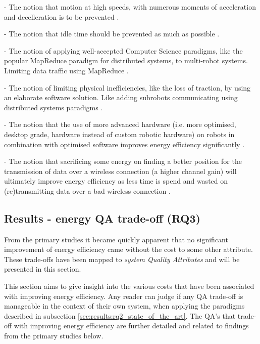 - The notion that motion at high speeds, with numerous moments of acceleration and decelleration is to be prevented
\cite{wingstrom2013robot_cell_scheduling}.

- The notion that idle time should be prevented as much as possible \cite{gurel2019industrial_robot_scheduling, 
kaitwanidvilai2020industrial_robot_cycle_time}.

- The notion of applying well-accepted Computer Science paradigms, like the popular MapReduce paradigm for distributed systems,
to multi-robot systems. Limiting data traffic using MapReduce \cite{huh2013distributed_swarm}.

- The notion of limiting physical inefficiencies, like the loss of traction, by using an elaborate software solution.
Like adding subrobots communicating using distributed systems paradigms \cite{kim2016firefighting_robot}.

- The notion that the use of more advanced hardware (i.e. more optimised, desktop grade, hardware instead of custom robotic hardware) 
on robots in combination with optimised software improves energy efficiency significantly \cite{cheng2018FPGA_image_recognition}.

- The notion that sacrificing some energy on finding a better position for the transmission of data over a wireless connection
(a higher channel gain) will ultimately improve energy efficiency as less time is spend and wasted on (re)transmitting 
data over a bad wireless connection \cite{licea2013wireless_comms}.


\subsection{Results - energy QA trade-off (RQ3)}
\label{sec:results:rq3_trade_off}
From the primary studies it became quickly apparent that no significant improvement of energy efficiency came without the cost
to some other attribute. These trade-offs have been mapped to 
\textit{system Quality Attributes\cite{iso2011quality_attributes}} and will be presented
in this section.

This section aims to give insight into the various costs that have been associated with improving energy efficiency.
Any reader can judge if any QA trade-off is manageable in the context of their own system, when applying the paradigms
described in subsection \ref{sec:results:rq2_state_of_the_art}. 
The QA's that trade-off with improving energy efficiency are further detailed and related to findings from the primary studies below.

